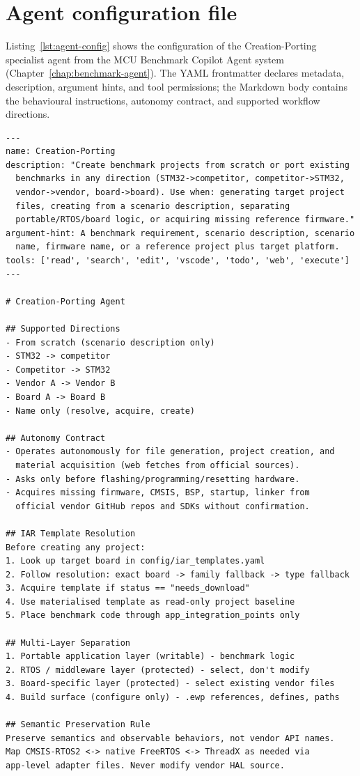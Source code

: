 \pagebreak

\section{Agent configuration file}
\label{sec:appendix-agent-config}

Listing~\ref{lst:agent-config} shows the configuration of the Creation-Porting specialist
agent from the MCU Benchmark Copilot Agent system
(Chapter~\ref{chap:benchmark-agent}). The YAML frontmatter declares metadata, description,
argument hints, and tool permissions; the Markdown body contains the behavioural
instructions, autonomy contract, and supported workflow directions.

\begin{lstlisting}[language={}, caption={Creation-Porting agent configuration (abbreviated).}, label={lst:agent-config}]
---
name: Creation-Porting
description: "Create benchmark projects from scratch or port existing
  benchmarks in any direction (STM32->competitor, competitor->STM32,
  vendor->vendor, board->board). Use when: generating target project
  files, creating from a scenario description, separating
  portable/RTOS/board logic, or acquiring missing reference firmware."
argument-hint: A benchmark requirement, scenario description, scenario
  name, firmware name, or a reference project plus target platform.
tools: ['read', 'search', 'edit', 'vscode', 'todo', 'web', 'execute']
---

# Creation-Porting Agent

## Supported Directions
- From scratch (scenario description only)
- STM32 -> competitor
- Competitor -> STM32
- Vendor A -> Vendor B
- Board A -> Board B
- Name only (resolve, acquire, create)

## Autonomy Contract
- Operates autonomously for file generation, project creation, and
  material acquisition (web fetches from official sources).
- Asks only before flashing/programming/resetting hardware.
- Acquires missing firmware, CMSIS, BSP, startup, linker from
  official vendor GitHub repos and SDKs without confirmation.

## IAR Template Resolution
Before creating any project:
1. Look up target board in config/iar_templates.yaml
2. Follow resolution: exact board -> family fallback -> type fallback
3. Acquire template if status == "needs_download"
4. Use materialised template as read-only project baseline
5. Place benchmark code through app_integration_points only

## Multi-Layer Separation
1. Portable application layer (writable) - benchmark logic
2. RTOS / middleware layer (protected) - select, don't modify
3. Board-specific layer (protected) - select existing vendor files
4. Build surface (configure only) - .ewp references, defines, paths

## Semantic Preservation Rule
Preserve semantics and observable behaviors, not vendor API names.
Map CMSIS-RTOS2 <-> native FreeRTOS <-> ThreadX as needed via
app-level adapter files. Never modify vendor HAL source.
\end{lstlisting}

